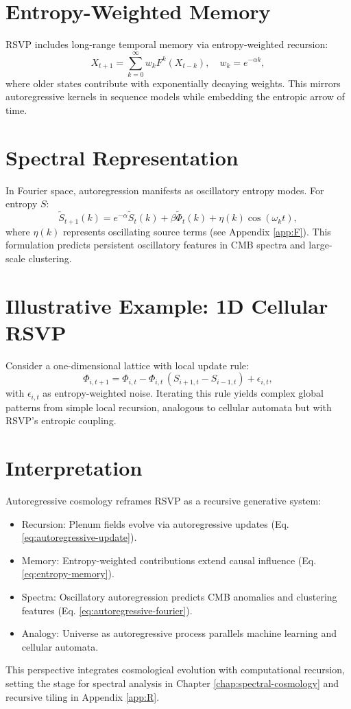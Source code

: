 \documentclass[12pt]{report}
\begin{document}
\section{Entropy-Weighted Memory}
RSVP includes long-range temporal memory via entropy-weighted recursion:
\begin{equation}
X_{t+1} = \sum_{k=0}^\infty w_k F^k(X_{t-k}), \quad w_k = e^{-\alpha k}, \label{eq:entropy-memory}
\end{equation}
where older states contribute with exponentially decaying weights. This mirrors autoregressive kernels in sequence models while embedding the entropic arrow of time.

\section{Spectral Representation}
In Fourier space, autoregression manifests as oscillatory entropy modes. For entropy \(S\):
\begin{equation}
\tilde{S}_{t+1}(k) = e^{-\alpha} \tilde{S}_t(k) + \beta \tilde{\Phi}_t(k) + \eta(k) \cos(\omega_k t), \label{eq:autoregressive-fourier}
\end{equation}
where \(\eta(k)\) represents oscillating source terms (see Appendix \ref{app:F}). This formulation predicts persistent oscillatory features in CMB spectra and large-scale clustering.

\section{Illustrative Example: 1D Cellular RSVP}
Consider a one-dimensional lattice with local update rule:
\begin{equation}
\Phi_{i,t+1} = \Phi_{i,t} - \Phi_{i,t} \, (S_{i+1,t} - S_{i-1,t}) + \epsilon_{i,t},
\end{equation}
with \(\epsilon_{i,t}\) as entropy-weighted noise. Iterating this rule yields complex global patterns from simple local recursion, analogous to cellular automata but with RSVP’s entropic coupling.

\section{Interpretation}
Autoregressive cosmology reframes RSVP as a recursive generative system:
\begin{itemize}
    \item Recursion: Plenum fields evolve via autoregressive updates (Eq. \eqref{eq:autoregressive-update}).
    \item Memory: Entropy-weighted contributions extend causal influence (Eq. \eqref{eq:entropy-memory}).
    \item Spectra: Oscillatory autoregression predicts CMB anomalies and clustering features (Eq. \eqref{eq:autoregressive-fourier}).
    \item Analogy: Universe as autoregressive process parallels machine learning and cellular automata.
\end{itemize}
This perspective integrates cosmological evolution with computational recursion, setting the stage for spectral analysis in Chapter \ref{chap:spectral-cosmology} and recursive tiling in Appendix \ref{app:R}.
\end{document}
